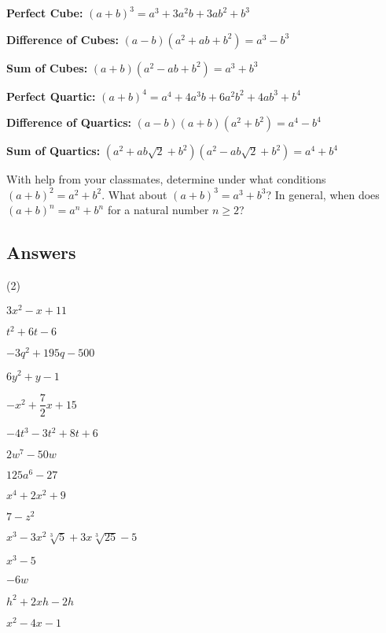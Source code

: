 \begin{tasks}[resume]

\task \textbf{Perfect Cube:} $(a+b)^3 = a^3 + 3a^2b + 3ab^2 + b^3$ \label{specialformexfirst}

\task \textbf{Difference of Cubes:} $(a - b)(a^2 + ab + b^2) = a^3 - b^3$

\task \textbf{Sum of Cubes:} $(a + b)(a^2 - ab + b^2) = a^3 + b^3$

\task \textbf{Perfect Quartic:} $(a+b)^4 = a^4 + 4a^3b + 6a^2b^2 + 4ab^3 + b^4$

\task \textbf{Difference of Quartics:} $(a-b)(a+b)(a^2+b^2) = a^4 - b^4$

\task \textbf{Sum of Quartics:}  $(a^2 + ab \sqrt{2} + b^2)(a^2 - ab \sqrt{2} + b^2) = a^4 + b^4$ \label{specialformexlast}

\task With help from your classmates, determine under what conditions $(a+b)^2 = a^2 + b^2$.  What about $(a+b)^3 = a^3 + b^3$? In general, when does $(a+b)^n = a^n + b^n$ for a natural number $n \geq 2$?

\end{tasks}

\clearpage

\subsection{Answers}

\begin{tasks}(2)

\task $3x^2 - x + 11$

\task $t^2 + 6t-6$

\task $-3q^2+195q-500$

\task $6y^2+y-1$

\task $-x^2 + \dfrac{7}{2} x + 15$

\task $-4t^3-3t^2+8t+6$

\task $2w^7 - 50w$

\task $125a^6 - 27$

\task $x^4+2x^2+9$

\task $7-z^2$

\task $x^3 - 3x^2\sqrt[3]{5} + 3x\sqrt[3]{25} - 5$

\task $x^3 - 5$

\task $-6w$

\task $h^2 + 2xh - 2h$

\task $x^2 - 4x - 1$ 

\end{tasks}

